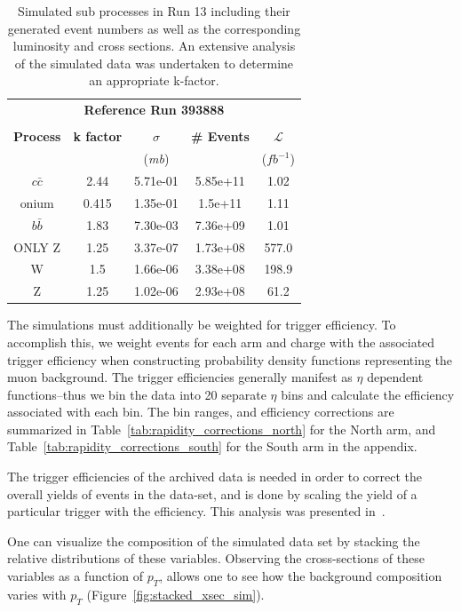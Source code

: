 \begin{table}[ht]
  \centering
  \begin{tabular}{ccccc}
    \toprule
    \multicolumn{5}{c}{\textbf{Reference Run 393888}}\\ 
     & & & & \\
    \textbf{Process} & 
    \textbf{k factor} & 
    \textbf{$\sigma$ } & 
    \textbf{\# Events} & 
    \textbf{ $\mathcal{L}$ } \\
    & & (\textit{mb}) &  & ($fb^{-1}$) \\
    \midrule
    $c\bar{c}$ & 2.44  & 5.71e-01 & 5.85e+11 & 1.02 \\
    onium      & 0.415 & 1.35e-01 &  1.5e+11 & 1.11 \\
    $b\bar{b}$ & 1.83  & 7.30e-03 & 7.36e+09 & 1.01 \\
    ONLY Z     & 1.25  & 3.37e-07 & 1.73e+08 & 577.0\\
    W          & 1.5   & 1.66e-06 & 3.38e+08 & 198.9\\
    Z          & 1.25  & 1.02e-06 & 2.93e+08 & 61.2 \\
    \bottomrule
  \end{tabular}
  \caption{
    Simulated sub processes in Run 13 including their generated event numbers as
    well as the corresponding luminosity and cross sections.  An extensive
    analysis of the simulated data was undertaken to determine an appropriate
    k-factor. 
  }
  \label{tab:simulation_cross_sections}
\end{table}                  


The simulations must additionally be weighted for trigger efficiency. To
accomplish this, we weight events for each arm and charge with the associated
trigger efficiency when constructing probability density functions representing
the muon background. The trigger efficiencies generally manifest as $\eta$
dependent functions--thus we bin the data into 20 separate $\eta$ bins and
calculate the efficiency associated with each bin. The bin ranges, and
efficiency corrections are summarized in
Table~\ref{tab:rapidity_corrections_north} for the North arm, and
Table~\ref{tab:rapidity_corrections_south} for the South arm in the appendix.

The trigger efficiencies of the archived data is needed in order to correct the
overall yields of events in the data-set, and is done by scaling the yield of a
particular trigger with the efficiency. This analysis was presented
in~\cite{Seidl2014a}.

One can visualize the composition of the simulated data set by stacking the
relative distributions of these variables. Observing the cross-sections of these
variables as a function of $p_T$, allows one to see how the background
composition varies with $p_T$ (Figure~\ref{fig:stacked_xsec_sim}).

